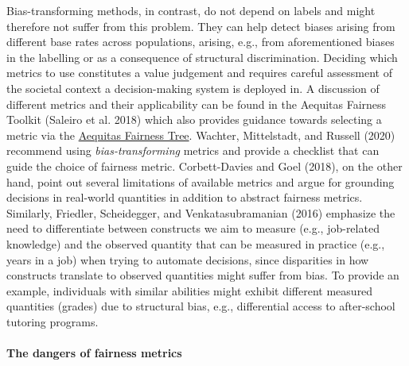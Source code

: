 Bias-transforming methods, in contrast, do not depend on labels and might therefore not suffer from this problem.
They can help detect biases arising from different base rates across populations, arising, e.g., from aforementioned biases in the labelling or as a consequence of structural discrimination.
Deciding which metrics to use constitutes a value judgement and requires careful assessment of the societal context a decision-making system is deployed in.
A discussion of different metrics and their applicability can be found in the Aequitas Fairness Toolkit (Saleiro et al. 2018) which also provides guidance towards selecting a metric via the \href{http://www.datasciencepublicpolicy.org/our-work/tools-guides/aequitas/}{Aequitas Fairness Tree}.
Wachter, Mittelstadt, and Russell (2020) recommend using \emph{bias-transforming} metrics and provide a checklist that can guide the choice of fairness metric.
Corbett-Davies and Goel (2018), on the other hand, point out several limitations of available metrics and argue for grounding decisions in real-world quantities in addition to abstract fairness metrics.
Similarly, Friedler, Scheidegger, and Venkatasubramanian (2016) emphasize the need to differentiate between constructs we aim to measure (e.g., job-related knowledge) and the observed quantity that can be measured in practice (e.g., years in a job) when trying to automate decisions, since disparities in how constructs translate to observed quantities might suffer from bias.
To provide an example, individuals with similar abilities might exhibit different measured quantities (grades) due to structural bias, e.g., differential access to after-school tutoring programs.

\hypertarget{the-dangers-of-fairness-metrics}{%
\paragraph{The dangers of fairness metrics}\label{the-dangers-of-fairness-metrics}}

